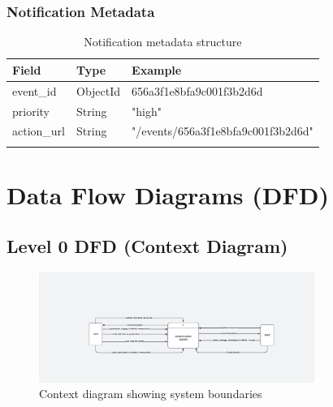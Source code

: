 \subsubsection{Notification Metadata}
\begin{longtable}{|C{2.5cm}|C{1.8cm}|C{7cm}|}
\hline
\textbf{Field} & \textbf{Type} & \textbf{Example} \\ \hline
\endhead

event\_id & ObjectId & 656a3f1e8bfa9c001f3b2d6d \\ \hline
priority & String & "high" \\ \hline
action\_url & String & "/events/656a3f1e8bfa9c001f3b2d6d" \\ \hline

\caption{Notification metadata structure}
\label{tab:notification_metadata}
\end{longtable}

\section{Data Flow Diagrams (DFD)}

\subsection{Level 0 DFD (Context Diagram)}
\begin{figure}[H]
    \centering
    \includegraphics[width=0.8\textwidth]{images/dfd_level0.png}
    \caption{Context diagram showing system boundaries}
    \label{fig:dfd0}
\end{figure}

